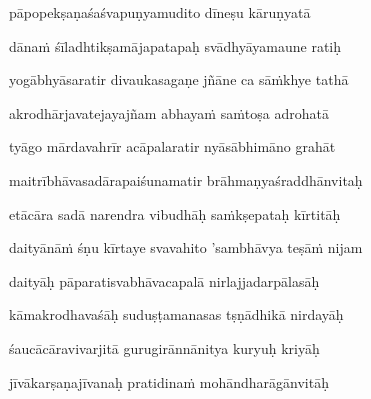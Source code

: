 \ujvers\nemsloka 
pāpopekṣaṇaśaśvapuṇyamudito dīneṣu kāruṇyatā
\dontdisplaylinenum

\nemslokab 
dāna\.m śīladhtikṣamājapatapaḥ svādhyāyamaune ratiḥ \danda\dontdisplaylinenum

\nemslokac 
yogābhyāsaratir divaukasagaṇe jñāne ca sā\.mkhye tathā
\dontdisplaylinenum

\nemslokad 
akrodhārjavatejayajñam abhaya\.m sa\.mtoṣa adrohatā \veg\dontdisplaylinenum

\ujvers\nemsloka 
tyāgo mārdavahrīr acāpalaratir nyāsābhimāno grahāt
\dontdisplaylinenum

\nemslokab 
maitrībhāvasadārapaiśunamatir brāhmaṇyaśraddhānvitaḥ \danda\dontdisplaylinenum

\nemslokac 
etācāra sadā narendra vibudhāḥ sa\.mkṣepataḥ kīrtitāḥ
\dontdisplaylinenum

\nemslokad 
daityānā\.m śṇu kīrtaye svavahito 'sambhāvya teṣā\.m nijam \veg\dontdisplaylinenum

\ujvers\nemsloka 
daityāḥ pāparatisvabhāvacapalā nirlajjadarpālasāḥ
\dontdisplaylinenum

\nemslokab 
kāmakrodhavaśāḥ suduṣṭamanasas tṣṇādhikā nirdayāḥ \danda\dontdisplaylinenum

\nemslokac 
śaucācāravivarjitā gurugirānnānitya kuryuḥ kriyāḥ
\dontdisplaylinenum

\nemslokad 
jīvākarṣaṇajīvanaḥ pratidina\.m mohāndharāgānvitāḥ \veg\dontdisplaylinenum

